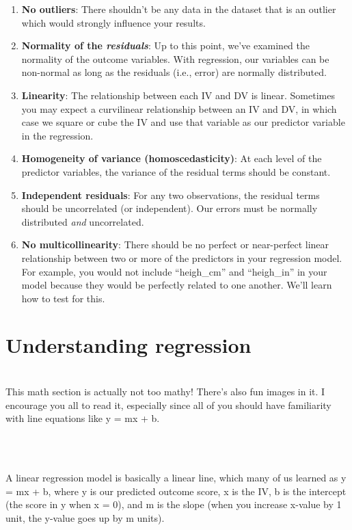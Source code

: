 \documentclass[
]{book}
\newenvironment{info}
    {
    \hline\\
    }
    { 
    \\\\\hline
    }
\begin{document}
\begin{enumerate}
\def\labelenumi{\arabic{enumi}.}
\item
  \textbf{No outliers}: There shouldn't be any data in the dataset that is an outlier which would strongly influence your results.
\item
  \textbf{Normality of the \emph{residuals}}: Up to this point, we've examined the normality of the outcome variables. With regression, our variables can be non-normal as long as the residuals (i.e., error) are normally distributed.
\item
  \textbf{Linearity}: The relationship between each IV and DV is linear. Sometimes you may expect a curvilinear relationship between an IV and DV, in which case we square or cube the IV and use that variable as our predictor variable in the regression.
\item
  \textbf{Homogeneity of variance (homoscedasticity)}: At each level of the predictor variables, the variance of the residual terms should be constant.
\item
  \textbf{Independent residuals}: For any two observations, the residual terms should be uncorrelated (or independent). Our errors must be normally distributed \emph{and} uncorrelated.
\item
  \textbf{No multicollinearity}: There should be no perfect or near-perfect linear relationship between two or more of the predictors in your regression model. For example, you would not include ``heigh\_cm'' and ``heigh\_in'' in your model because they would be perfectly related to one another. We'll learn how to test for this.
\end{enumerate}

\hypertarget{understanding-regression}{%
\section{Understanding regression}\label{understanding-regression}}

\begin{info}
This math section is actually not too mathy! There's also fun images in
it. I encourage you all to read it, especially since all of you should
have familiarity with line equations like y = mx + b.
\end{info}

A linear regression model is basically a linear line, which many of us learned as y = mx + b, where y is our predicted outcome score, x is the IV, b is the intercept (the score in y when x = 0), and m is the slope (when you increase x-value by 1 unit, the y-value goes up by m units).
\end{document}
